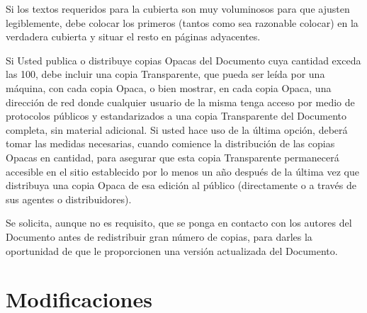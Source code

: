 Si los textos requeridos para la cubierta son muy voluminosos para
que ajusten legiblemente, debe colocar los primeros (tantos como sea
razonable colocar) en la verdadera cubierta y situar el resto en páginas
adyacentes.

Si Usted publica o distribuye copias Opacas del Documento cuya cantidad
exceda las 100, debe incluir una copia Transparente, que pueda ser
leída por una máquina, con cada copia Opaca, o bien mostrar, en cada
copia Opaca, una dirección de red donde cualquier usuario de la misma
tenga acceso por medio de protocolos públicos y estandarizados a una
copia Transparente del Documento completa, sin material adicional.
Si usted hace uso de la última opción, deberá tomar las medidas necesarias,
cuando comience la distribución de las copias Opacas en cantidad,
para asegurar que esta copia Transparente permanecerá accesible en
el sitio establecido por lo menos un año después de la última vez
que distribuya una copia Opaca de esa edición al público (directamente
o a través de sus agentes o distribuidores).

Se solicita, aunque no es requisito, que se ponga en contacto con
los autores del Documento antes de redistribuir gran número de copias,
para darles la oportunidad de que le proporcionen una versión actualizada
del Documento.


\section{Modificaciones}

